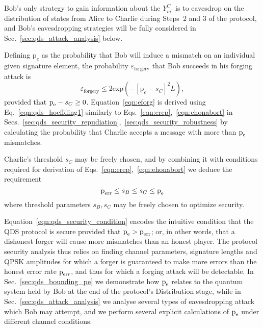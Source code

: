Bob's only strategy to gain information about the $Y_{m^\prime}^C$ is to eavesdrop on the distribution of states from Alice to Charlie during Steps~$2$ and $3$ of the protocol, and Bob's eavesdropping strategies will be fully considered in Sec.~\ref{sec:qds_attack_analysis} below.

Defining $\text{p}_e$ as the probability that Bob will induce a mismatch on an individual given signature element, the probability $\varepsilon_{\text{forgery}}$ that Bob succeeds in his forging attack is
\begin{equation}\label{eqn:eforg}
\varepsilon_{\text{forgery}} \le 2 \text{exp}\left( - \left[\text{p}_e - s_C\right]^2 L\right), 
\end{equation}
provided that $\text{p}_{\text{e}} - s_C \ge 0$. Equation~\ref{eqn:eforg} is derived using Eq.~\ref{eqn:qds_hoeffding1} similarly to Eqs.~\ref{eqn:erep},~\ref{eqn:ehonabort} in Secs.~\ref{sec:qds_security_repudiation},~\ref{sec:qds_security_robustness} by calculating the probability that Charlie accepts a message with more than $\text{p}_{\text{e}}$ mismatches.

Charlie's threshold $s_C$ may be freely chosen, and by combining it with conditions required for derivation of Eqs.~\ref{eqn:erep},~\ref{eqn:ehonabort} we deduce the requirement
\begin{equation}\label{eqn:qds_security_condition}
\text{p}_{\text{err}} \le s_B \le s_C \le \text{p}_{\text{e}} 
\end{equation}
where threshold parameters $s_B, s_C$ may be freely chosen to optimize security. 

Equation~\ref{eqn:qds_security_condition} encodes the intuitive condition that the QDS protocol is secure provided that $\text{p}_{\text{e}} > \text{p}_{\text{err}}$; or, in other words, that a dishonest forger will cause more mismatches than an honest player. The protocol security analysis thus relies on finding channel parameters, signature lengths and QPSK amplitudes for which a forger is guaranteed to make more errors than the honest error rate $\text{p}_{\text{err}}$, and thus for which a forging attack will be detectable. In Sec.~\ref{sec:qds_bounding_pe} we demonstrate how $\text{p}_{\text{e}}$ relates to the quantum system held by Bob at the end of the protocol's Distribution stage, while in Sec.~\ref{sec:qds_attack_analysis} we analyse several types of eavesdropping attack which Bob may attempt, and we perform several explicit calculations of $\text{p}_{\text{e}}$ under different channel conditions.


